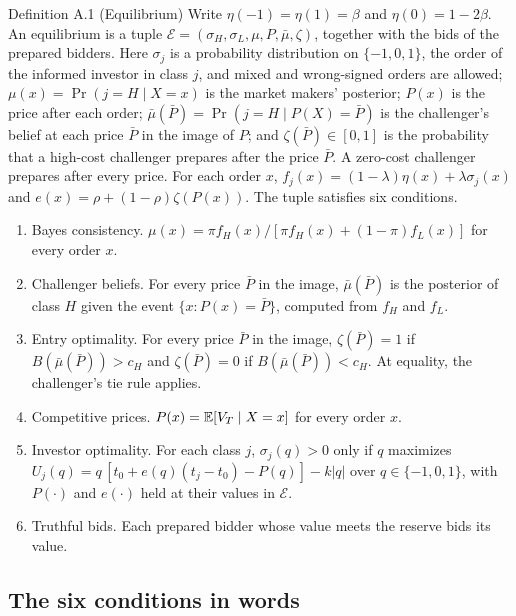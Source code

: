 \begin{paperresult}{Definition A.1 (Equilibrium)}
Write \(\eta(-1)=\eta(1)=\beta\) and \(\eta(0)=1-2\beta\).
An equilibrium is a tuple \(\mathcal{E}=(\sigma_H,\sigma_L,\mu,P,\bar\mu,\zeta)\), together with the bids of the prepared bidders.
Here \(\sigma_j\) is a probability distribution on \(\{-1,0,1\}\), the order of the informed investor in class \(j\), and mixed and wrong-signed orders are allowed;
\(\mu(x)=\Pr(j=H\mid X=x)\) is the market makers' posterior;
\(P(x)\) is the price after each order;
\(\bar\mu(\bar P)=\Pr(j=H\mid P(X)=\bar P)\) is the challenger's belief at each price \(\bar P\) in the image of \(P\);
and \(\zeta(\bar P)\in[0,1]\) is the probability that a high-cost challenger prepares after the price \(\bar P\).
A zero-cost challenger prepares after every price.
For each order \(x\), \(f_j(x)=(1-\lambda)\eta(x)+\lambda\sigma_j(x)\) and \(e(x)=\rho+(1-\rho)\zeta(P(x))\).
The tuple satisfies six conditions.
\begin{enumerate}[label=(E\arabic*),leftmargin=3em]
\item Bayes consistency. \(\mu(x)=\pi f_H(x)/[\pi f_H(x)+(1-\pi)f_L(x)]\) for every order \(x\).
\item Challenger beliefs. For every price \(\bar P\) in the image, \(\bar\mu(\bar P)\) is the posterior of class \(H\) given the event \(\{x:P(x)=\bar P\}\), computed from \(f_H\) and \(f_L\).
\item Entry optimality. For every price \(\bar P\) in the image, \(\zeta(\bar P)=1\) if \(B(\bar\mu(\bar P))>c_H\) and \(\zeta(\bar P)=0\) if \(B(\bar\mu(\bar P))<c_H\). At equality, the challenger's tie rule applies.
\item Competitive prices. \(P(x)=\mathbb{E}[V_T\mid X=x]\) for every order \(x\).
\item Investor optimality. For each class \(j\), \(\sigma_j(q)>0\) only if \(q\) maximizes \(U_j(q)=q\,[t_0+e(q)(t_j-t_0)-P(q)]-k|q|\) over \(q\in\{-1,0,1\}\), with \(P(\cdot)\) and \(e(\cdot)\) held at their values in \(\mathcal{E}\).
\item Truthful bids. Each prepared bidder whose value meets the reserve bids its value.
\end{enumerate}
\end{paperresult}

\subsection*{The six conditions in words}

